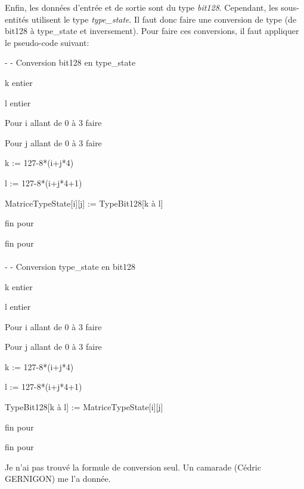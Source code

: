 \documentclass[a4paper, 12pt]{article}
\begin{document}
Enfin, les données d'entrée et de sortie sont du type \emph{bit128}. Cependant, les sous-entités utilisent le type \emph{type\_state}. Il faut donc faire une conversion de type (de bit128 à type\_state et inversement). Pour faire ces conversions, il faut appliquer le pseudo-code suivant: \\
{\selectfont 
	- - Conversion bit128 en type\_state \par
	k entier \par
	l entier \par
	Pour i allant de 0 à 3 faire \par
		\hspace*{1cm} Pour j allant de 0 à 3 faire \par
			\hspace*{2cm} k := 127-8*(i+j*4) \par
			\hspace*{2cm} l := 127-8*(i+j*4+1) \par
			\hspace*{2cm} MatriceTypeState[i][j] := TypeBit128[k à l] \par
		\hspace*{1cm} fin pour \par
	fin pour \\ \\
	
	- - Conversion type\_state en bit128 \par
	k entier \par
	l entier \par
	Pour i allant de 0 à 3 faire \par
		\hspace*{1cm} Pour j allant de 0 à 3 faire \par
			\hspace*{2cm} k := 127-8*(i+j*4) \par
			\hspace*{2cm} l := 127-8*(i+j*4+1) \par
			\hspace*{2cm} TypeBit128[k à l] := MatriceTypeState[i][j] \par
		\hspace*{1cm} fin pour \par
	fin pour \\
}
Je n'ai pas trouvé la formule de conversion seul. Un camarade (Cédric GERNIGON) me l'a donnée.
\end{document}
